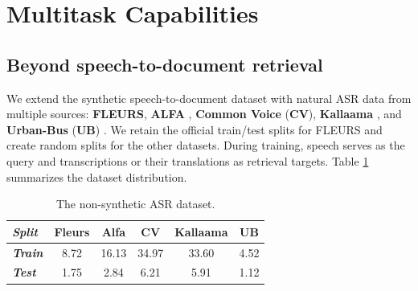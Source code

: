 \documentclass[11pt]{article}
\begin{document}
\section{Multitask Capabilities}
\subsection{Beyond speech-to-document retrieval}
\label{sec:asr}
We extend the synthetic speech-to-document dataset with natural ASR data from multiple sources: \textbf{FLEURS}, \textbf{ALFA} \cite{gauthierSSL}, \textbf{Common Voice} (\textbf{CV}), \textbf{Kallaama} \cite{kallama}, and \textbf{Urban-Bus} (\textbf{UB}) \cite{urbanbus}. We retain the official train/test splits for FLEURS and create random splits for the other datasets. During training, speech serves as the query and transcriptions or their translations as retrieval targets. Table \ref{tab:asr_data} summarizes the dataset distribution.
\begin{table}[ht]
    \centering
    {\small{
    \begin{tabular}{lccccc}
        \toprule
        \textbf{\textit{Split}} & \textbf{Fleurs} & \textbf{Alfa} & \textbf{CV} & \textbf{Kallaama} & \textbf{UB} \\
        \midrule
        \textbf{\textit{Train}} & 8.72 & 16.13 & 34.97 & 33.60 & 4.52 \\
        \textbf{\textit{Test}} & 1.75 & 2.84 & 6.21 & 5.91 & 1.12 \\
        \bottomrule
    \end{tabular}
    }}
\caption{The non-synthetic ASR dataset.}
    \label{tab:asr_data}
\end{table}
\end{document}
